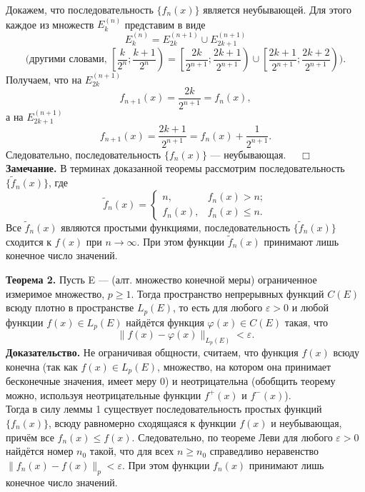 \documentclass[12pt,a4paper, titlepage]{article}
\begin{document}
Докажем, что последовательность $\lbrace f_n(x) \rbrace$ является неубывающей. Для этого каждое из множеств $E_k^{(n)}$ представим в виде
$$
E_k^{(n)} = E_{2k}^{(n+1)} \cup E_{2k+1}^{(n+1)}
$$
$$
\biggr(\mbox{другими словами, } \left[\frac k {2^n} ; \frac {k+1} {2^n}\right) = \left[\frac {2k} {2^{n+1}} ; \frac {2k+1} {2^{n+1}}\right) \cup \left[\frac {2k+1}{2^{n+1}} ; \frac {2k + 2} {2^{n+1}} \right) \biggl).
$$
Получаем, что на $E_{2k}^{(n+1)}$
$$
f_{n+1}(x) = \frac {2k}{2^{n+1}} = f_n(x),
$$
а на $E_{2k+1}^{(n+1)}$
$$
f_{n+1}(x) = \frac {2k+1}{2^{n+1}} = f_n(x) + \frac 1 {2^{n+1}}.
$$
Следовательно, последовательность $\lbrace f_n(x) \rbrace$ --- неубывающая.  $\quad \Box$\\

\textbf{Замечание.} В терминах доказанной теоремы рассмотрим последовательность $\lbrace \tilde f_n(x) \rbrace$, где
$$
\tilde f_n(x) =
\begin{cases}
n, & f_n(x) > n; \\
f_n(x), & f_n(x) \leqslant n.
\end{cases}
$$
Все $\tilde f_n(x)$ являются простыми функциями, последовательность $\lbrace \tilde f_n(x) \rbrace$ сходится к $f(x)$ при $n \to \infty$. При этом функции $\tilde f_n(x)$ принимают лишь конечное число значений.

\textbf{Теорема 2.} Пусть E --- (алт. множество конечной меры) ограниченное измеримое множество, $p \geqslant 1$. Тогда пространство непрерывных функций $C(E)$ всюду плотно в пространстве $L_p(E)$, то есть для любого $\varepsilon > 0$ и любой функции $f(x) \in L_p(E)$ найдётся функция $\varphi (x) \in C(E)$ такая, что 
$$
\|f(x) - \varphi(x)\|_{L_p(E)} < \varepsilon.
$$
\textbf{Доказательство.} Не ограничивая общности, считаем, что функция $f(x)$ всюду конечна (так как $f(x) \in L_p(E)$, множество, на котором она принимает бесконечные значения, имеет меру 0) и неотрицательна (обобщить теорему можно, используя неотрицательные функции $f^+(x)$ и $f^-(x)$).\\

Тогда в силу леммы 1 существует последовательность простых функций $\lbrace f_n(x) \rbrace$, всюду равномерно сходящаяся к функции $f(x)$ и неубывающая, причём все $f_n(x) \leqslant f(x)$. Следовательно, по теореме Леви для любого $\varepsilon > 0$ найдётся номер $n_0$ такой, что для всех $n \geqslant n_0$ справедливо неравенство $\|f_n(x) - f(x)\|_p < \varepsilon$. При этом функции $f_n(x)$ принимают лишь конечное число значений.\\
\end{document}
